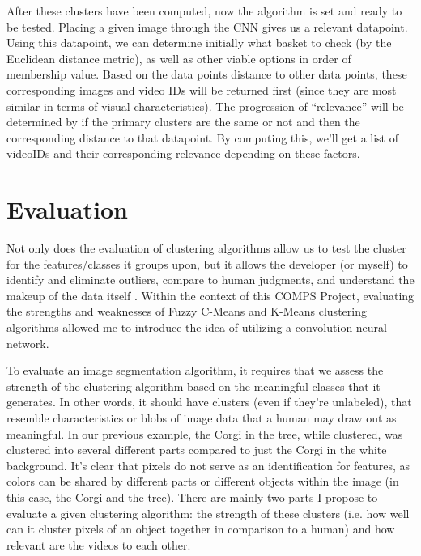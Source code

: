 \documentclass[10pt,twocolumn]{article}
\begin{document}
	

After these clusters have been computed, now the algorithm is set and ready to be tested. Placing a given image through the CNN gives us a relevant datapoint. Using this datapoint, we can determine initially what basket to check (by the Euclidean distance metric), as well as other viable options in order of membership value. Based on the data points distance to other data points, these corresponding images and video IDs will be returned first (since they are most similar in terms of visual characteristics). The progression of “relevance” will be determined by if the primary clusters are the same or not and then the corresponding distance to that datapoint. By computing this, we’ll get a list of videoIDs and their corresponding relevance depending on these factors. 

\section{Evaluation}

Not only does the evaluation of clustering algorithms allow us to test the cluster for the features/classes it groups upon, but it allows the developer (or myself) to identify and eliminate outliers, compare to human judgments, and understand the makeup of the data itself \cite{Lavrenko2014}. Within the context of this COMPS Project, evaluating the strengths and weaknesses of Fuzzy C-Means and K-Means clustering algorithms allowed me to introduce the idea of utilizing a convolution neural network.

To evaluate an image segmentation algorithm, it requires that we assess the strength of the clustering algorithm based on the meaningful classes that it generates. In other words, it should have clusters (even if they’re unlabeled), that resemble characteristics or blobs of image data that a human may draw out as meaningful. In our previous example, the Corgi in the tree, while clustered, was clustered into several different parts compared to just the Corgi in the white background. It’s clear that pixels do not serve as an identification for features, as colors can be shared by different parts or different objects within the image (in this case, the Corgi and the tree). There are mainly two parts I propose to evaluate a given clustering algorithm: the strength of these clusters (i.e. how well can it cluster pixels of an object together in comparison to a human) and how relevant are the videos to each other.
\end{document}
